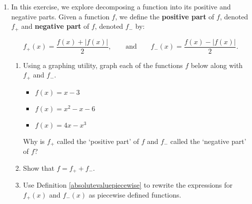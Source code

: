 \begin{enumerate}
\setcounter{enumi}{\value{HW}}

\item \label{posnegdecompexercise}  In this exercise, we explore decomposing a function into its positive and negative parts.  Given a function $f$, we define the \textbf{positive part} of $f$, denoted $f_{+}$ and \textbf{negative part} of $f$, denoted $f_{-}$ by:

\[ f_{+}(x) = \dfrac{f(x) + |f(x)|}{2}, \qquad \text{and} \qquad f_{-}(x) = \dfrac{f(x) - |f(x)|}{2}. \]

\begin{enumerate}

\item Using a graphing utility, graph each of the functions $f$ below along with $f_{+}$ and $f_{-}$.

\begin{multicols}{3}

\begin{itemize}

\item  $f(x) = x-3$

\item  $f(x) = x^2-x-6$

\item  $f(x) = 4x-x^3$

\end{itemize}

\end{multicols}

Why is $f_{+}$ called the `positive part' of $f$ and $f_{-}$ called the `negative part' of $f$?

\item Show that $f = f_{+} + f_{-}$.

\item Use Definition \ref{absolutevaluepiecewise} to rewrite the expressions for $f_{+}(x)$ and $f_{-}(x)$ as piecewise defined functions.

\end{enumerate}  

\setcounter{HW}{\value{enumi}}
\end{enumerate}


